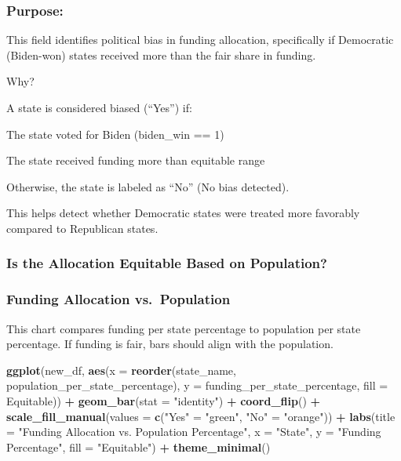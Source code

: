 \documentclass[
]{article}
\newenvironment{Shaded}{\begin{snugshade}}{\end{snugshade}}
\newcommand{\AttributeTok}[1]{\textcolor[rgb]{0.13,0.29,0.53}{#1}}
\newcommand{\FunctionTok}[1]{\textcolor[rgb]{0.13,0.29,0.53}{\textbf{#1}}}
\newcommand{\NormalTok}[1]{#1}
\newcommand{\OtherTok}[1]{\textcolor[rgb]{0.56,0.35,0.01}{#1}}
\newcommand{\SpecialCharTok}[1]{\textcolor[rgb]{0.81,0.36,0.00}{\textbf{#1}}}
\newcommand{\StringTok}[1]{\textcolor[rgb]{0.31,0.60,0.02}{#1}}
\begin{document}
\subsubsection{Purpose:}\label{purpose-2}

This field identifies political bias in funding allocation, specifically
if Democratic (Biden-won) states received more than the fair share in
funding.

Why?

A state is considered biased (``Yes'') if:

The state voted for Biden (biden\_win == 1)

The state received funding more than equitable range

Otherwise, the state is labeled as ``No'' (No bias detected).

This helps detect whether Democratic states were treated more favorably
compared to Republican states.

\subsubsection{Is the Allocation Equitable Based on
Population?}\label{is-the-allocation-equitable-based-on-population}

\subsubsection{Funding Allocation
vs.~Population}\label{funding-allocation-vs.-population}

This chart compares funding per state percentage to population per state
percentage. If funding is fair, bars should align with the population.

\begin{Shaded}
\begin{Highlighting}[]
\FunctionTok{ggplot}\NormalTok{(new\_df, }\FunctionTok{aes}\NormalTok{(}\AttributeTok{x =} \FunctionTok{reorder}\NormalTok{(state\_name, population\_per\_state\_percentage), }
                   \AttributeTok{y =}\NormalTok{ funding\_per\_state\_percentage, }
                   \AttributeTok{fill =}\NormalTok{ Equitable)) }\SpecialCharTok{+}
  \FunctionTok{geom\_bar}\NormalTok{(}\AttributeTok{stat =} \StringTok{"identity"}\NormalTok{) }\SpecialCharTok{+}
  \FunctionTok{coord\_flip}\NormalTok{() }\SpecialCharTok{+}
  \FunctionTok{scale\_fill\_manual}\NormalTok{(}\AttributeTok{values =} \FunctionTok{c}\NormalTok{(}\StringTok{"Yes"} \OtherTok{=} \StringTok{"green"}\NormalTok{, }\StringTok{"No"} \OtherTok{=} \StringTok{"orange"}\NormalTok{)) }\SpecialCharTok{+}
  \FunctionTok{labs}\NormalTok{(}\AttributeTok{title =} \StringTok{"Funding Allocation vs. Population Percentage"}\NormalTok{,}
       \AttributeTok{x =} \StringTok{"State"}\NormalTok{,}
       \AttributeTok{y =} \StringTok{"Funding Percentage"}\NormalTok{,}
       \AttributeTok{fill =} \StringTok{"Equitable"}\NormalTok{) }\SpecialCharTok{+}
  \FunctionTok{theme\_minimal}\NormalTok{()}
\end{Highlighting}
\end{Shaded}
\end{document}
